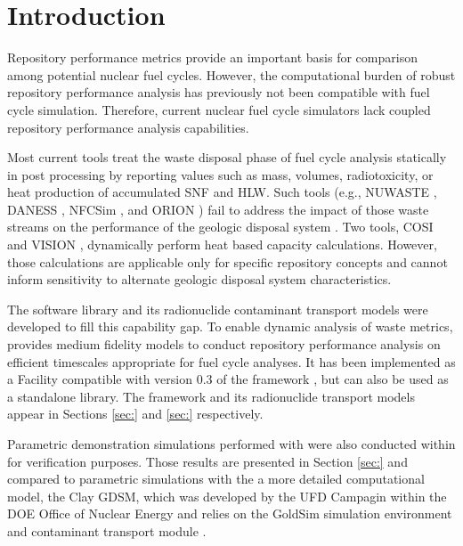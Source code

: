 \section{Introduction}\label{sec:introduction}
Repository performance metrics provide an important basis for comparison among
potential nuclear fuel cycles.
However, the computational
burden of robust repository performance analysis has previously not been
compatible with fuel cycle simulation.
Therefore, current nuclear fuel cycle simulators
lack coupled repository performance analysis capabilities.

Most current tools treat the waste disposal
phase of fuel cycle analysis statically in post processing by reporting
values such as mass, volumes, radiotoxicity, or heat production of accumulated
\gls{SNF} and \gls{HLW}. Such tools
(e.g.,
\gls{NUWASTE} \cite{abkowitz_nuclear_2010},
\gls{DANESS} \cite{van_den_durpel_daness:_2006},
\gls{NFCSim} \cite{schneider_nfcsim_2004}, and
ORION \cite{gregg_orion_2011})
fail to address the impact of those waste streams on the performance of the
geologic disposal system \cite{wilson_comparing_2011}.  Two tools, \gls{COSI}
\cite{boucher_international_2010} and \gls{VISION} \cite{yacout_vision_2006,
wilson_comparing_2011, radel_repository_2007, boucher_international_2010},
dynamically perform heat based capacity calculations.
However, those calculations are applicable only for specific
repository concepts and cannot inform sensitivity to alternate geologic disposal
system characteristics.

The \Cyder software library \cite{huff_cyder_2013} and its radionuclide
contaminant transport models were  developed to fill this capability gap.  To
enable dynamic analysis of waste metrics, \Cyder provides medium fidelity
models to conduct repository performance analysis on efficient timescales
appropriate for fuel cycle analyses. It has been implemented as a Facility
compatible with version 0.3 of the \Cyclus framework \cite{wilson_cyclus:_2012}, but can
also be used as a standalone library.
The \Cyder framework and its radionuclide transport models appear in Sections
\ref{sec:} and \ref{sec:} respectively.

Parametric demonstration simulations performed with \Cyder were also conducted
within \Cyclus for verification purposes. Those results are presented in
Section \ref{sec:} and compared to parametric simulations with the a more
detailed computational model, the Clay \gls{GDSM}, which was developed by the
\gls{UFD} Campagin within the \gls{DOE} Office of Nuclear Energy
\cite{clayton_generic_2011} and relies on the GoldSim simulation environment
\cite{golder_associates_goldsim_2010-1} and contaminant transport module
\cite{golder_associates_goldsim_2010-1}.

